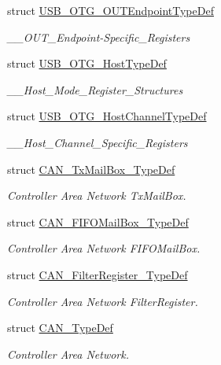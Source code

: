 \begin{DoxyCompactItemize}
struct \hyperlink{struct_u_s_b___o_t_g___o_u_t_endpoint_type_def}{U\+S\+B\+\_\+\+O\+T\+G\+\_\+\+O\+U\+T\+Endpoint\+Type\+Def}
\begin{DoxyCompactList}\small\item\em \+\_\+\+\_\+\+O\+U\+T\+\_\+\+Endpoint-\/\+Specific\+\_\+\+Registers \end{DoxyCompactList}\item 
struct \hyperlink{struct_u_s_b___o_t_g___host_type_def}{U\+S\+B\+\_\+\+O\+T\+G\+\_\+\+Host\+Type\+Def}
\begin{DoxyCompactList}\small\item\em \+\_\+\+\_\+\+Host\+\_\+\+Mode\+\_\+\+Register\+\_\+\+Structures \end{DoxyCompactList}\item 
struct \hyperlink{struct_u_s_b___o_t_g___host_channel_type_def}{U\+S\+B\+\_\+\+O\+T\+G\+\_\+\+Host\+Channel\+Type\+Def}
\begin{DoxyCompactList}\small\item\em \+\_\+\+\_\+\+Host\+\_\+\+Channel\+\_\+\+Specific\+\_\+\+Registers \end{DoxyCompactList}\item 
struct \hyperlink{struct_c_a_n___tx_mail_box___type_def}{C\+A\+N\+\_\+\+Tx\+Mail\+Box\+\_\+\+Type\+Def}
\begin{DoxyCompactList}\small\item\em Controller Area Network Tx\+Mail\+Box. \end{DoxyCompactList}\item 
struct \hyperlink{struct_c_a_n___f_i_f_o_mail_box___type_def}{C\+A\+N\+\_\+\+F\+I\+F\+O\+Mail\+Box\+\_\+\+Type\+Def}
\begin{DoxyCompactList}\small\item\em Controller Area Network F\+I\+F\+O\+Mail\+Box. \end{DoxyCompactList}\item 
struct \hyperlink{struct_c_a_n___filter_register___type_def}{C\+A\+N\+\_\+\+Filter\+Register\+\_\+\+Type\+Def}
\begin{DoxyCompactList}\small\item\em Controller Area Network Filter\+Register. \end{DoxyCompactList}\item 
struct \hyperlink{struct_c_a_n___type_def}{C\+A\+N\+\_\+\+Type\+Def}
\begin{DoxyCompactList}\small\item\em Controller Area Network. \end{DoxyCompactList}\item 

\end{DoxyCompactItemize}
